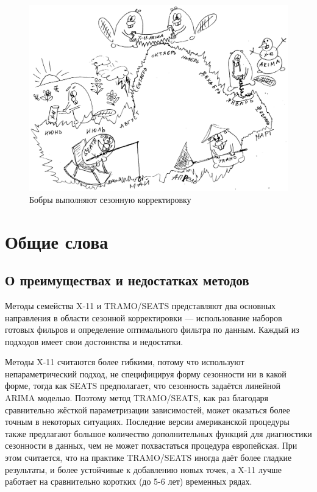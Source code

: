 \documentclass[final,pdftex]{../../template/epsilonj}\usepackage[]{graphicx}\usepackage[]{color}
\begin{document}
\begin{figure}[hbtp]
\caption{Бобры выполняют сезонную корректировку}
\centering
\includegraphics[scale=0.6]{../bobr/bobr_final.png}
\end{figure}



\section{Общие слова}
\subsection{О преимуществах и недостатках методов}

Методы семейства X-11 и TRAMO/SEATS представляют два основных направления в области сезонной корректировки --- использование наборов готовых фильров и определение оптимального фильтра по данным. Каждый из подходов имеет свои достоинства и недостатки. 

Методы X-11 считаются более гибкими, потому что используют непараметрический подход, не специфицируя форму сезонности ни в какой форме, тогда как SEATS предполагает, что сезонность задаётся линейной ARIMA моделью. Поэтому метод TRAMO/SEATS, как раз благодаря сравнительно жёсткой параметризации зависимостей, может оказаться более точным в некоторых ситуациях. Последние версии американской процедуры также предлагают большое количество дополнительных функций для диагностики сезонности в данных, чем не может похвастаться процедура европейская. При этом считается, что на практике TRAMO/SEATS иногда даёт более гладкие результаты, и более устойчивые к добавлению новых точек, а X-11 лучше работает на сравнительно коротких (до 5-6 лет) временных рядах. 
\end{document}
